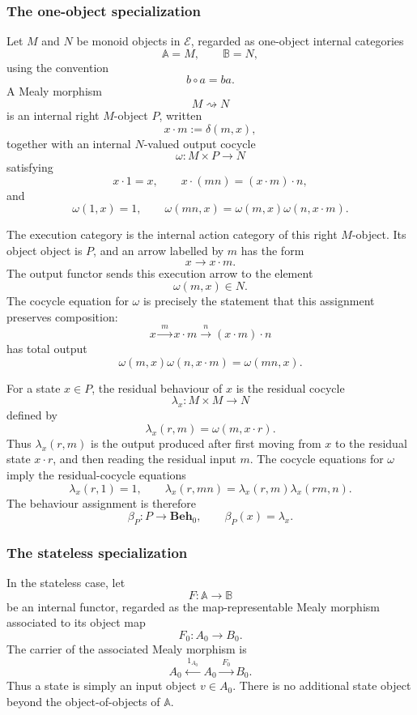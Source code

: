 \subsubsection{The one-object specialization}

Let \(M\) and \(N\) be monoid objects in \(\mathcal E\), regarded as one-object internal categories
\[
    \mathbb A=M,
    \qquad
    \mathbb B=N,
\]
using the convention
\[
    b\circ a=ba.
\]
A Mealy morphism
\[
    M\rightsquigarrow N
\]
is an internal right \(M\)-object \(P\), written
\[
    x\cdot m:=\delta(m,x),
\]
together with an internal \(N\)-valued output cocycle
\[
    \omega:M\times P\to N
\]
satisfying
\[
    x\cdot 1=x,
    \qquad
    x\cdot(mn)=(x\cdot m)\cdot n,
\]
and
\[
    \omega(1,x)=1,
    \qquad
    \omega(mn,x)=\omega(m,x)\omega(n,x\cdot m).
\]

The execution category is the internal action category of this right \(M\)-object. Its object object is \(P\), and an arrow labelled by \(m\) has the form
\[
    x\longrightarrow x\cdot m.
\]
The output functor sends this execution arrow to the element
\[
    \omega(m,x)\in N.
\]
The cocycle equation for \(\omega\) is precisely the statement that this assignment preserves composition:
\[
    x
        \xrightarrow{\;m\;}
    x\cdot m
        \xrightarrow{\;n\;}
    (x\cdot m)\cdot n
\]
has total output
\[
    \omega(m,x)\omega(n,x\cdot m)
        =
    \omega(mn,x).
\]

For a state \(x\in P\), the residual behaviour of \(x\) is the residual cocycle
\[
    \lambda_x:M\times M\to N
\]
defined by
\[
    \lambda_x(r,m)=\omega(m,x\cdot r).
\]
Thus \(\lambda_x(r,m)\) is the output produced after first moving from \(x\) to the residual state \(x\cdot r\), and then reading the residual input \(m\). The cocycle equations for \(\omega\) imply the residual-cocycle equations
\[
    \lambda_x(r,1)=1,
    \qquad
    \lambda_x(r,mn)=\lambda_x(r,m)\lambda_x(rm,n).
\]
The behaviour assignment is therefore
\[
    \beta_P:P\to \mathbf{Beh}_0,
    \qquad
    \beta_P(x)=\lambda_x.
\]

\subsubsection{The stateless specialization}

In the stateless case, let
\[
    F:\mathbb A\to\mathbb B
\]
be an internal functor, regarded as the map-representable Mealy morphism associated to its object map
\[
    F_0:A_0\to B_0.
\]
The carrier of the associated Mealy morphism is
\[
    A_0
        \xleftarrow{\;1_{A_0}\;}
    A_0
        \xrightarrow{\;F_0\;}
    B_0.
\]
Thus a state is simply an input object \(v\in A_0\). There is no additional
state object beyond the object-of-objects of \(\mathbb A\).

